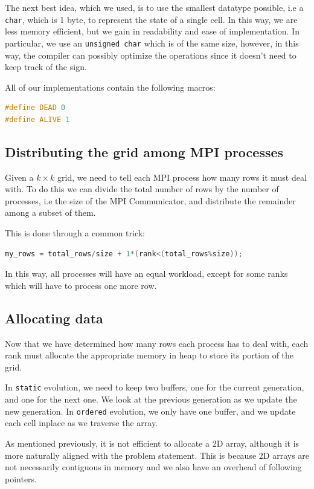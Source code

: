 \documentclass{report}
\begin{document}
The next best idea, which we used, is to use the smallest datatype possible, 
i.e a \texttt{char}, which is 1 byte, to represent the state of a single cell.
In this way, we are less memory efficient, but we gain in readability and ease 
of implementation. In particular, we use an \texttt{unsigned char} which 
is of the same size, however, in this way, the compiler can possibly optimize 
the operations since it doesn't need to keep track of the sign.

All of our implementations contain the following macros:
\begin{lstlisting}[language=C++]
#define DEAD 0 
#define ALIVE 1
\end{lstlisting}

\subsection{Distributing the grid among MPI processes}

Given a $k \times k$ grid, we need to tell each MPI process how many rows it must 
deal with.
To do this we can divide the total number of rows by the number of processes, i.e 
the size of the MPI Communicator, and distribute the remainder among a subset 
of them.

This is done through a common trick:
\begin{lstlisting}[language=C++]
    my_rows = total_rows/size + 1*(rank<(total_rows%size));
\end{lstlisting}

In this way, all processes will have an equal workload, except for some ranks 
which will have to process one more row.

\subsection{Allocating data}

Now that we have determined how many rows each process has to deal with, each 
rank must allocate the appropriate memory in heap to store its portion of the 
grid.

In \texttt{static} evolution, we need to keep two buffers, one for the current 
generation, and one for the next one. We look at the previous generation as we 
update the new generation. In \texttt{ordered} evolution, we only have one buffer, 
and we update each cell inplace as we traverse the array.

As mentioned previously, it is not efficient to allocate a 2D array, although it 
is more naturally aligned with the problem statement. This is because 2D arrays 
are not necessarily contiguous in memory and we also have an overhead of 
following pointers.
\end{document}

